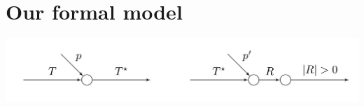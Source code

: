 \section{Our formal model} \label{sec:background}



% 
{\centering
\includegraphics[width=.8\textwidth]{schematic}
\par}


